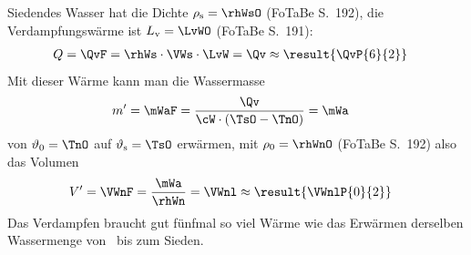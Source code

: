 Siedendes Wasser hat die Dichte $\rho_\text{s} = \rhWsO$ (FoTaBe S.~192), die Verdampfungswärme ist $L_\text{v} = \LvWO$ (FoTaBe S.~191):
\begin{align}
 Q &= \QvF = \rhWs\cdot\VWs\cdot\LvW = \Qv \approx \result{\QvP{6}{2}}
\end{align}
Mit dieser Wärme kann man die Wassermasse
\begin{align}
 m' &= \mWaF = \frac{\Qv}{\cW\cdot\left(\TsO-\TnO\right)} = \mWa
\end{align}
von $\vartheta_0 = \TnO$ auf $\vartheta_\text{s} = \TsO$ erwärmen, mit $\rho_0 = \rhWnO$ (FoTaBe S.~192) also das Volumen
\begin{align}
 V' &= \VWnF = \frac{\mWa}{\rhWn} = \VWnl \approx \result{\VWnlP{0}{2}}
\end{align}
Das Verdampfen braucht gut fünfmal so viel Wärme wie das Erwärmen derselben Wassermenge von \TnO\ bis zum Sieden.

